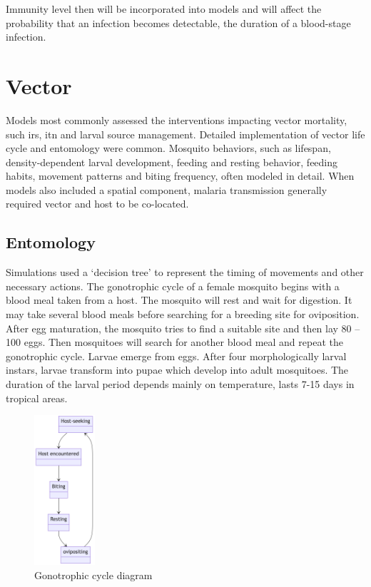\documentclass[a4paper, 12pt, twoside]{article}
\begin{document}

Immunity level then will be incorporated into models and will affect the probability that an infection becomes detectable, the duration of a blood-stage infection.

\section{Vector}%
\label{sec:vector}
Models most commonly assessed the interventions impacting vector mortality, such \gls{irs}, \gls{itn} and larval source management.
Detailed implementation of vector life cycle and entomology were common.
Mosquito behaviors, such as lifespan, density-dependent larval development, feeding and resting behavior, feeding habits, movement patterns and biting frequency, often modeled in detail.
When models also included a spatial component, malaria transmission generally required vector and host to be co-located.

\subsection{Entomology}
Simulations used a ‘decision tree’ to represent the timing of movements and other necessary actions.
The gonotrophic cycle of a female mosquito begins with a blood meal taken from a host.
The mosquito will rest and wait for digestion.
It may take several blood meals before searching for a breeding site for oviposition.
After egg maturation, the mosquito tries to find a suitable site and then lay 80 – 100 eggs.
Then mosquitoes will search for another blood meal and repeat the gonotrophic cycle.
Larvae emerge from eggs.
After four morphologically larval instars, larvae transform into pupae which develop into adult mosquitoes.
The duration of the larval period depends mainly on temperature, lasts 7-15 days in tropical areas.

\begin{figure}[htpb]
	\centering
	\includegraphics[width=0.2\textwidth]{gonotrophic-cycle-diagram}
	\caption{Gonotrophic cycle diagram}
	\label{fig:gonotrophic-cycle-diagram}
\end{figure}
\end{document}
